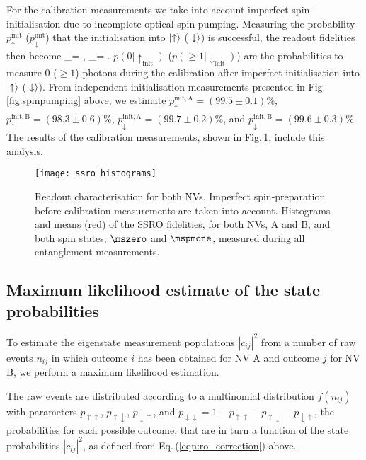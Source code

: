 For the calibration measurements we take into account imperfect spin-initialisation due to incomplete optical spin pumping\cite{Robledo:2011fs}. Measuring the probability $p^\mathrm{init}_\uparrow$ ($p^\mathrm{init}_\downarrow$) that the initialisation into $\left|\uparrow\right>$ ($\left|\downarrow\right>$) is successful, the readout fidelities then become
\be
	\fid_\uparrow = ,
\ee
\be
	\fid_\downarrow = .
\ee
$p(0|\uparrow_\text{init})$ ($p(\geq 1|\downarrow_\text{init})$) are the probabilities to measure 0 ($\geq 1$) photons during the calibration after imperfect initialisation into $\left|\uparrow\right>$ ($\left|\downarrow\right>$). From independent initialisation measurements presented in Fig.\,\ref{fig:spinpumping} above, we estimate $p^\mathrm{init,A}_\uparrow = (99.5 \pm 0.1)\%$, $p^\mathrm{init,B}_\uparrow = (98.3 \pm 0.6)\%$, $p^\mathrm{init,A}_\downarrow = (99.7 \pm 0.2)\%$, and $p^\mathrm{init,B}_\downarrow = (99.6 \pm 0.3)\%$. The results of the calibration measurements, shown in Fig.\,\ref{fig:ssrohist}, include this analysis.

\begin{figure}[h]
    \centering
    \texttt{[image: ssro\_histograms]}
    \caption{Readout characterisation for both NVs. Imperfect spin-preparation before calibration measurements are taken into account. Histograms and means (red) of the SSRO fidelities, for both NVs, A and B, and both spin states, $\mszero$ and $\mspmone$, measured during all entanglement measurements.}
	\label{fig:ssrohist}
\end{figure}

\subsection{Maximum likelihood estimate of the state probabilities}
To estimate the eigenstate measurement populations $|c_{ij}|^2$ from a number of raw events $n_{ij}$ in which outcome $i$ has been obtained for NV A and outcome $j$ for NV B, we perform a maximum likelihood estimation.

The raw events are distributed according to a multinomial distribution $f(n_{ij})$ with parameters $p_{\uparrow\uparrow}$, $p_{\uparrow\downarrow}$, $p_{\downarrow\uparrow}$, and $p_{\downarrow\downarrow} = 1 - p_{\uparrow\uparrow} - p_{\uparrow\downarrow} - p_{\downarrow\uparrow}$, the probabilities for each possible outcome, that are in turn a function of the state probabilities $|c_{ij}|^2$, as defined from Eq.\,(\ref{eqn:ro_correction}) above.

